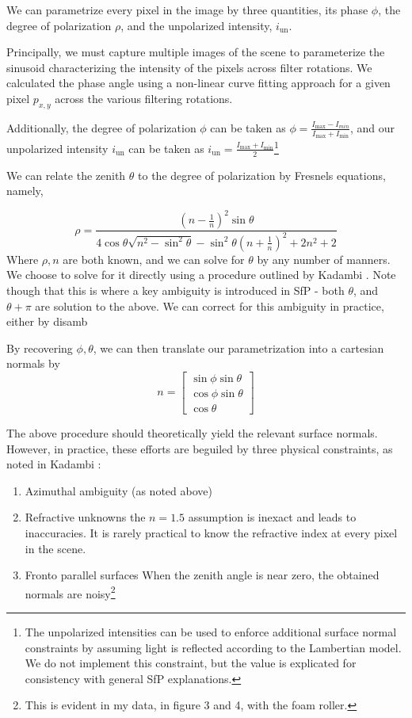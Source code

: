 \documentclass[final]{cvpr}
\begin{document}
	We can parametrize every pixel in the image by three quantities, its phase $\phi$, the degree of polarization $\rho$, and the unpolarized intensity, $i_{\text{un}}$. 
	
	Principally, we must capture multiple images of the scene to parameterize the sinusoid characterizing the intensity of the pixels across filter rotations. We calculated the phase angle using a non-linear curve fitting approach for a given pixel $p_{x,y}$ across the various filtering rotations. 
	
	Additionally, the degree of polarization $\phi$ can be taken as $\phi = \frac{I_{\max} - I_{min}}{I_{\max} + I_{\min}}$, and our unpolarized intensity $i_{\text{un}}$ can be taken as $i_{\text{un}} = \frac{I_{\max} + I_{\min}}{2}$\footnote{The unpolarized intensities can be used to enforce additional surface normal constraints by assuming light is reflected according to the Lambertian model. We do not implement this constraint, but the value is explicated for consistency with general SfP explanations.}
	
	We can relate the zenith $\theta$ to the degree of polarization by Fresnels equations, namely, 
	
	$$\rho = \frac{(n - \frac{1}{n})^2 \sin\theta}{4 \cos\theta \sqrt{n^2 - \sin^2\theta} - \sin^2\theta (n + \frac{1}{n})^2 + 2n^2 + 2}$$Where $\rho, n$ are both known, and we can solve for $\theta$ by any number of manners. We choose to solve for it directly using a procedure outlined by Kadambi \cite{Kadambi2017}. Note though that this is where a key ambiguity is introduced in SfP - both $\theta$, and $\theta + \pi$ are solution to the above. We can correct for this ambiguity in practice, either by disamb
	
	By recovering $\phi, \theta$, we can then translate our parametrization into a cartesian normals by $$n = \begin{bmatrix}
		\sin\phi \sin\theta\\
		\cos\phi \sin\theta\\
		\cos \theta
	\end{bmatrix}$$
	
	The above procedure should theoretically yield the relevant surface normals. However, in practice, these efforts are beguiled by three physical constraints, as noted in Kadambi \cite{Kadambi2017}:
	\begin{enumerate}
		\item Azimuthal ambiguity (as noted above)
		\item Refractive unknowns
		\subitem the $n=1.5$ assumption is inexact and leads to inaccuracies. It is rarely practical to know the refractive index at every pixel in the scene.
		\item Fronto parallel surfaces
		\subitem When the zenith angle is near zero, the obtained normals are noisy\footnote{This is evident in my data, in figure 3 and 4, with the foam roller.}  
	\end{enumerate} 
	
\end{document}
